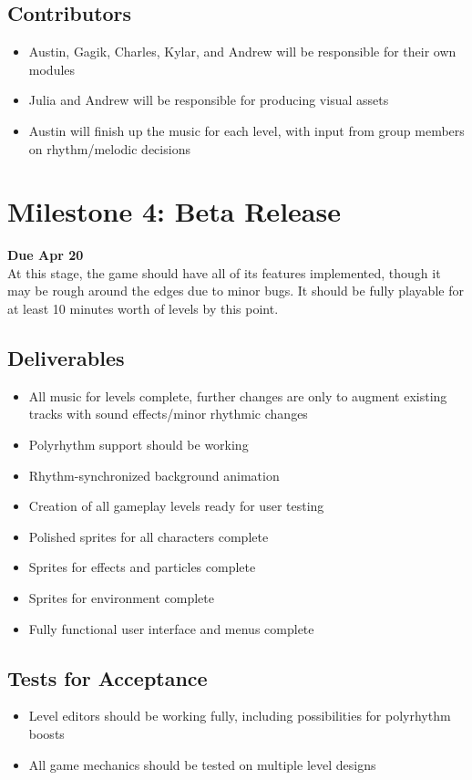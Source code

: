 \documentclass[]{article}
\begin{document}
\subsection*{Contributors}
\begin{itemize}
\item Austin, Gagik, Charles, Kylar, and Andrew will be responsible 
  for their own modules
\item Julia and Andrew will be responsible for producing visual assets
\item Austin will finish up the music for each level, with input from 
  group members on rhythm/melodic decisions
\end{itemize}

\pagebreak
\section*{Milestone 4: Beta Release}
\noindent\textbf{Due Apr 20}\\
At this stage, the game should have all of its features implemented,
though it may be rough around the edges due to minor bugs. It should
be fully playable for at least 10 minutes worth of levels by this point.
\subsection*{Deliverables}
\begin{itemize}
\item All music for levels complete, further changes are only to
  augment existing tracks with sound effects/minor rhythmic changes
\item Polyrhythm support should be working
\item Rhythm-synchronized background animation
\item Creation of all gameplay levels ready for user testing
\item Polished sprites for all characters complete
\item Sprites for effects and particles complete
\item Sprites for environment complete
\item Fully functional user interface and menus complete
\end{itemize}
\subsection*{Tests for Acceptance}
\begin{itemize}
\item Level editors should be working fully, including 
  possibilities for polyrhythm boosts
\item All game mechanics should be tested on multiple level designs
\end{itemize}
\end{document}
